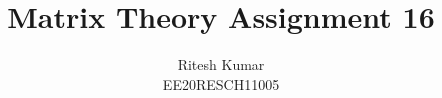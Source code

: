 \documentclass[journal,12pt,twocolumn]{IEEEtran}
\DeclareMathOperator*{\Res}{Res}
\begin{document}
	
	
	\newtheorem{theorem}{Theorem}[section]
	\newtheorem{problem}{Problem}
	\newtheorem{proposition}{Proposition}[section]
	\newtheorem{lemma}{Lemma}[section]
	\newtheorem{corollary}[theorem]{Corollary}
	\newtheorem{example}{Example}[section]
	\newtheorem{definition}[problem]{Definition}
	\newcommand\bigZero[1][17]{\mbox{\fontsize{#1}{0}\selectfont$0$}}
	\newcommand{\BEQA}{\begin{eqnarray}}
	\newcommand{\EEQA}{\end{eqnarray}}
	\newcommand{\define}{\stackrel{\triangle}{=}}
	
	\providecommand{\mbf}{\mathbf}
	\providecommand{\pr}[1]{\ensuremath{\Pr\left(#1\right)}}
	\providecommand{\qfunc}[1]{\ensuremath{Q\left(#1\right)}}
	\providecommand{\sbrak}[1]{\ensuremath{{}\left[#1\right]}}
	\providecommand{\lsbrak}[1]{\ensuremath{{}\left[#1\right.}}
	\providecommand{\rsbrak}[1]{\ensuremath{{}\left.#1\right]}}
	\providecommand{\brak}[1]{\ensuremath{\left(#1\right)}}
	\providecommand{\lbrak}[1]{\ensuremath{\left(#1\right.}}
	\providecommand{\rbrak}[1]{\ensuremath{\left.#1\right)}}
	\providecommand{\cbrak}[1]{\ensuremath{\left\{#1\right\}}}
	\providecommand{\lcbrak}[1]{\ensuremath{\left\{#1\right.}}
	\providecommand{\rcbrak}[1]{\ensuremath{\left.#1\right\}}}
	\theoremstyle{remark}
	\newtheorem{rem}{Remark}
	\newcommand{\sgn}{\mathop{\mathrm{sgn}}}
	\providecommand{\abs}[1]{\left\vert#1\right\vert}
	\providecommand{\res}[1]{\Res\displaylimits_{#1}} 
	\providecommand{\norm}[1]{\left\lVert#1\right\rVert}
	\providecommand{\mtx}[1]{\mathbf{#1}}
	\providecommand{\mean}[1]{E\left[ #1 \right]}
	\providecommand{\fourier}{\overset{\mathcal{F}}{ \rightleftharpoons}}
	\providecommand{\system}{\overset{\mathcal{H}}{ \longleftrightarrow}}
	\newcommand{\solution}{\noindent \textbf{Solution: }}
	\newcommand{\cosec}{\,\text{cosec}\,}
	\providecommand{\dec}[2]{\ensuremath{\overset{#1}{\underset{#2}{\gtrless}}}}
	\newcommand{\myvec}[1]{\ensuremath{\begin{pmatrix}#1\end{pmatrix}}}
	\newcommand{\mydet}[1]{\ensuremath{\begin{vmatrix}#1\end{vmatrix}}}
	\makeatletter
	\makeatother
	\let\StandardTheFigure\thefigure
	\let\vec\mathbf
	\renewcommand{\thefigure}{\theproblem}
	\def\putbox#1#2#3{\makebox[0in][l]{\makebox[#1][l]{}\raisebox{\baselineskip}[0in][0in]{\raisebox{#2}[0in][0in]{#3}}}}
	\def\rightbox#1{\makebox[0in][r]{#1}}
	\def\centbox#1{\makebox[0in]{#1}}
	\def\topbox#1{\raisebox{-\baselineskip}[0in][0in]{#1}}
	\def\midbox#1{\raisebox{-0.5\baselineskip}[0in][0in]{#1}}
	\vspace{3cm}
	\title{Matrix Theory Assignment 16}
	\author{Ritesh Kumar \\ EE20RESCH11005}
	
\end{document}
